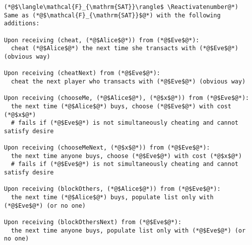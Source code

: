 \Suppressnumber
\begin{lstlisting}[label=satfunc, style=numbers]
(*@$\langle\mathcal{F}_{\mathrm{SAT}}\rangle$ \Reactivatenumber@*)
Same as (*@$\mathcal{F}_{\mathrm{SAT}}$@*) with the following additions:

Upon receiving (cheat, (*@$Alice$@*)) from (*@$Eve$@*):
  cheat (*@$Alice$@*) the next time she transacts with (*@$Eve$@*) (obvious way)

Upon receiving (cheatNext) from (*@$Eve$@*):
  cheat the next player who transacts with (*@$Eve$@*) (obvious way)

Upon receiving (chooseMe, (*@$Alice$@*), (*@$x$@*)) from (*@$Eve$@*):
  the next time (*@$Alice$@*) buys, choose (*@$Eve$@*) with cost (*@$x$@*)
  # fails if (*@$Eve$@*) is not simultaneously cheating and cannot satisfy desire

Upon receiving (chooseMeNext, (*@$x$@*)) from (*@$Eve$@*):
  the next time anyone buys, choose (*@$Eve$@*) with cost (*@$x$@*)
  # fails if (*@$Eve$@*) is not simultaneously cheating and cannot satisfy desire

Upon receiving (blockOthers, (*@$Alice$@*)) from (*@$Eve$@*):
  the next time (*@$Alice$@*) buys, populate list only with (*@$Eve$@*) (or no one)

Upon receiving (blockOthersNext) from (*@$Eve$@*):
  the next time anyone buys, populate list only with (*@$Eve$@*) (or no one)
\end{lstlisting}
